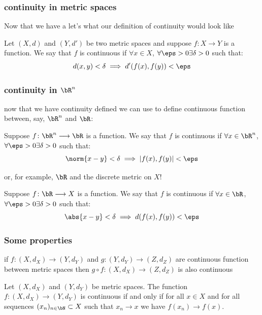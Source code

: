 \documentclass{beamer}
\begin{document}
\begin{frame}
    \frametitle{continuity in metric spaces}

    Now that we have a let's what our definition of continuity would look like \pause
    \begin{definition}
        Let $(X, d)$ and $(Y, d')$ be two metric spaces and suppose $f\colon X\longrightarrow Y$ is a function. We say that $f$ is continuous if $\forall x\in X$, $\forall\eps>0\exists\delta>0$ 
        such that:
        \[d(x, y)<\delta \implies d'(f(x), f(y))<\eps\]
    \end{definition}

\end{frame}

\begin{frame}
    \frametitle{continuity in $\bR^n$}

    now that we have continuity defined we can use to define continuous function between, say, $\bR^n$ and $\bR$: \pause
    \begin{definition}
        Suppose $f\colon \bR^n\longrightarrow \bR$ is a function. We say that $f$ is continuous if $\forall x\in \bR^n$, $\forall\eps>0\exists\delta>0$ 
        such that:
        \[\norm{x-y}<\delta \implies |f(x), f(y)|<\eps\]
    \end{definition} \pause
    or, for example, $\bR$ and the discrete metric on $X$!
    \begin{definition}
        Suppose $f\colon \bR\longrightarrow X$ is a function. We say that $f$ is continuous if $\forall x\in \bR$, $\forall\eps>0\exists\delta>0$ 
        such that:
        \[\abs{x-y}<\delta \implies d(f(x), f(y))<\eps\]
    \end{definition} \pause
\end{frame}

\begin{frame}
    \frametitle{Some properties}

    \begin{theorem}
        if $f\colon (X, d_X)\longrightarrow(Y, d_Y)$ and $g\colon(Y, d_Y)\longrightarrow(Z, d_Z)$ are continuous function between 
        metric spaces then $g\circ f\colon(X, d_X)\longrightarrow(Z, d_Z)$ is also continuous
    \end{theorem} \pause
    \begin{theorem}
        Let $(X, d_X)$ and $(Y, d_Y)$ be metric spaces. The function $f\colon (X, d_X)\longrightarrow(Y, d_Y)$ is continuous if and only if
        for all $x\in X$ and for all sequences $(x_n)_{n\in\bN}\subset X$ such that $x_n\to x$ we have $f(x_n) \to f(x)$.
    \end{theorem}

\end{frame}
\end{document}
